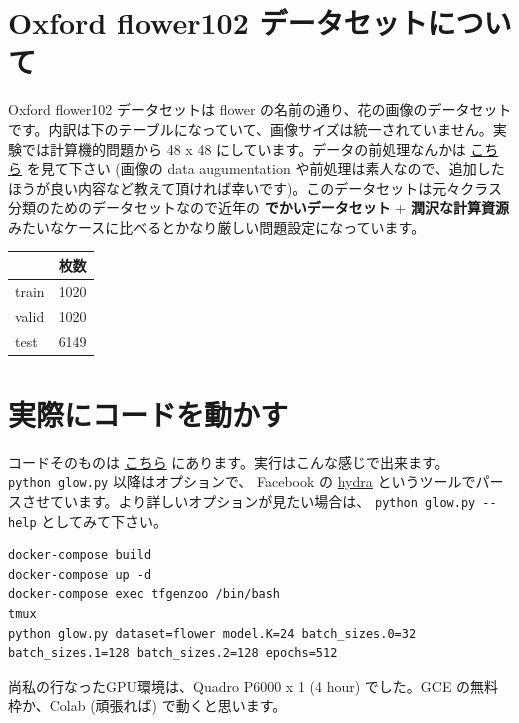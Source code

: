 \documentclass[dvipdfmx]{article}
\begin{document}
\section{Oxford flower102 データセットについて}
\label{sec:org194c07f}
Oxford flower102 データセットは flower の名前の通り、花の画像のデータセットです。内訳は下のテーブルになっていて、画像サイズは統一されていません。実験では計算機的問題から 48 x 48 にしています。データの前処理なんかは \href{https://github.com/MokkeMeguru/TFGENZOO\_EXAMPLE/blob/master/datasets/load\_flower.py}{こちら} を見て下さい (画像の data augumentation や前処理は素人なので、追加したほうが良い内容など教えて頂ければ幸いです)。このデータセットは元々クラス分類のためのデータセットなので近年の \textbf{でかいデータセット} + \textbf{潤沢な計算資源}  みたいなケースに比べるとかなり厳しい問題設定になっています。\\

\begin{center}
\begin{tabular}{lr}
\hline
 & 枚数\\
\hline
train & 1020\\
valid & 1020\\
test & 6149\\
\hline
\end{tabular}

\end{center}

\section{実際にコードを動かす}
\label{sec:orgaad07b5}
コードそのものは \href{https://github.com/MokkeMeguru/TFGENZOO\_EXAMPLE}{こちら} にあります。実行はこんな感じで出来ます。\\
\texttt{python glow.py} 以降はオプションで、 Facebook の \href{https://hydra.cc/}{hydra} というツールでパースさせています。より詳しいオプションが見たい場合は、 \texttt{python glow.py -{}-help} としてみて下さい。\\
\begin{verbatim}
docker-compose build
docker-compose up -d
docker-compose exec tfgenzoo /bin/bash
tmux
python glow.py dataset=flower model.K=24 batch_sizes.0=32 batch_sizes.1=128 batch_sizes.2=128 epochs=512
\end{verbatim}

尚私の行なったGPU環境は、Quadro P6000 x 1 (4 hour) でした。GCE の無料枠か、Colab (頑張れば) で動くと思います。\\
\end{document}
